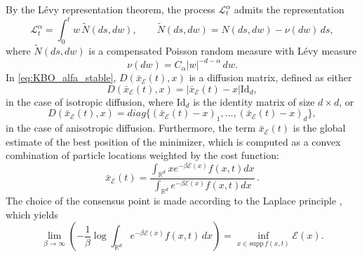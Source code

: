 \documentclass[11pt,handout]{article}%
\numberwithin{equation}{section}
\theoremstyle{definition}
\begin{document}
By the L\'evy representation theorem, the process $\mathcal{L}_t^\alpha$ admits the representation
\begin{equation}
	\mathcal{L}_t^\alpha = \int_{0}^t w \,\tilde{N}(ds,dw),
	\qquad 
	\tilde{N}(ds,dw) = N(ds,dw) - \nu(dw)\,ds,
\end{equation}
where $\tilde{N}(ds,dw)$ is a compensated Poisson random measure with L\'evy measure
\begin{equation*}
	\nu(dw) = C_{\alpha} |w|^{-d-\alpha}\,dw.
\end{equation*}
In \eqref{eq:KBO_alfa_stable}, $D(\bar{x}_\mathcal{E}(t),x)$ is a diffusion matrix, defined as either 
\[
D(\bar{x}_\mathcal{E}(t),x) = \vert \bar{x}_\mathcal{E}(t)-x \vert 
\textrm{Id}_d, 
\]
in the case of isotropic diffusion, where $\textrm{Id}_d$ is the identity matrix of size $d \times d$, or 
\[
D(\bar{x}_\mathcal{E}(t),x)  = diag\{(\bar{x}_\mathcal{E}(t)-x)_1,\ldots,(\bar{x}_\mathcal{E} (t)-x)_d\},
\]
in the case of anisotropic diffusion. Furthermore, the term $\bar{x}_\mathcal{E} (t)$ is the global estimate of the best position of the minimizer, which is computed as a convex combination of particle locations weighted by the cost function:
\begin{equation}\label{eq:x_tot}
	\bar{x}_\mathcal{E} (t) = \frac{\int_{\mathbb{R}^d}x e^{-\beta \mathcal{E}(x)}f(x,t)dx}{\int_{\mathbb{R}^d} e^{-\beta\mathcal{E}(x)}f(x,t)dx} \, .
\end{equation} 
The choice of the consensus point is made according to the Laplace principle \cite{dembo2009large, miller2006applied}, which yields
\begin{equation}\label{eq:laplace}
	\lim_{\beta \to \infty} 
	\left(
	-\frac{1}{\beta} \log \int_{\mathbb{R}^d} e^{-\beta \mathcal{E}(x)} f(x,t)\,dx
	\right)
	=
	\inf_{x \in \mathrm{supp}\, f(x,t)} \mathcal{E}(x).
\end{equation}
\end{document}
